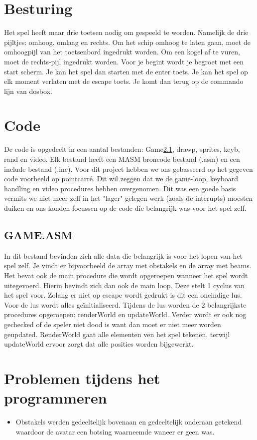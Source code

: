 \documentclass{article}
\begin{document}
\section{Besturing}

Het spel heeft maar drie toetsen nodig om gespeeld te worden. Namelijk de drie pijltjes: omhoog, omlaag en rechts.
Om het schip omhoog te laten gaan, moet de omhoogpijl van het toetsenbord ingedrukt worden.
Om een kogel af te vuren, moet de rechts-pijl ingedrukt worden.
Voor je begint wordt je begroet met een start scherm. Je kan het spel dan starten met de enter toets. 
Je kan het spel op elk moment verlaten met de escape toets. Je komt dan terug op de commando lijn van dosbox.

\section{Code}
De code is opgedeelt in een aantal bestanden: Game\ref{game_asm}, drawp, sprites, keyb, rand en video. Elk bestand heeft een MASM broncode bestand (.asm) en een include bestand (.inc).
Voor dit project hebben we ons gebasseerd op het gegeven code voorbeeld op pointcarr\'e. Dit wil zeggen dat we de game-loop, keyboard handling en video procedures hebben overgenomen. 
Dit was een goede basis vermits we niet meer zelf in het "lager" gelegen werk (zoals de interupts) moesten duiken en ons konden focussen op de code die belangrijk was voor het spel zelf.

\subsection{GAME.ASM}\label{game_asm}
In dit bestand bevinden zich alle data die belangrijk is voor het lopen van het spel zelf. Je vindt er bijvoorbeeld de array met obstakels en de array met beams.
Het bevat ook de main procedure die wordt opgeroepen wanneer het spel wordt uitegevoerd. Hierin bevindt zich dan ook de main loop. Deze stelt 1 cyclus van het spel voor.
Zolang er niet op escape wordt gedrukt is dit een oneindige lus. Voor de lus wordt alles geïnitialiseerd. Tijdens de lus worden de 2 belangrijkste procedures opgeroepen: renderWorld en updateWorld. 
Verder wordt er ook nog gechecked of de speler niet dood is want dan moet er niet meer worden geupdated.
RenderWorld gaat alle elementen ven het spel tekenen, terwijl updateWorld ervoor zorgt dat alle posities worden bijgewerkt. 


\section{Problemen tijdens het programmeren}
\begin {itemize}
\item Obstakels werden gedeeltelijk bovenaan en gedeeltelijk onderaan getekend waardoor de avatar een botsing waarneemde waneer er geen was.
\end {itemize}
\end{document}
